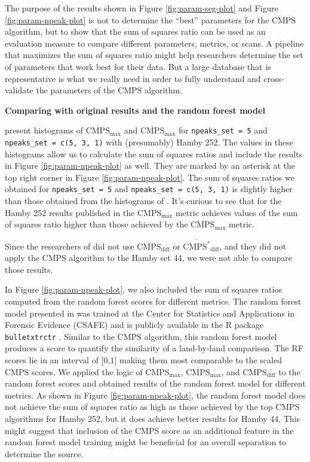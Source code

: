 The purpose of the results shown in Figure \ref{fig:param-seg-plot} and
Figure \ref{fig:param-npeak-plot} is not to determine the ``best''
parameters for the CMPS algorithm, but to show that the sum of squares
ratio can be used as an evaluation measure to compare different
parameters, metrics, or scans. A pipeline that maximizes the sum of
squares ratio might help researchers determine the set of parameters
that work best for their data. But a large database that is
representative is what we really need in order to fully understand and
cross-validate the parameters of the CMPS algorithm.

\textbf{Comparing with original results and the random forest model}

\citet{cmps} present histograms of \(\mathrm{CMPS_{max}}\) and
\(\mathrm{\overline{CMPS}_{max}}\) for \texttt{npeaks\_set\ =\ 5} and
\texttt{npeaks\_set\ =\ c(5,\ 3,\ 1)} with (presumably) Hamby 252. The
values in these histograms allow us to calculate the sum of squares
ratios and include the results in Figure \ref{fig:param-npeak-plot} as
well. They are marked by an asterisk at the top right corner in Figure
\ref{fig:param-npeak-plot}. The sum of squares ratios we obtained for
\texttt{npeaks\_set\ =\ 5} and \texttt{npeaks\_set\ =\ c(5,\ 3,\ 1)} is
slightly higher than those obtained from the histograms of \citet{cmps}.
It's curious to see that for the Hamby 252 results published in
\citet{cmps} the \(\mathrm{{CMPS}_{max}}\) metric achieves values of the
sum of squares ratio higher than those achieved by the
\(\mathrm{\overline{CMPS}_{max}}\) metric.

Since the researchers of \citet{cmps} did not use
\(\mathrm{\overline{CMPS}_{diff}}\) or
\(\mathrm{\overline{CMPS^*}_{diff}}\), and they did not apply the CMPS
algorithm to the Hamby set 44, we were not able to compare those
results.

In Figure \ref{fig:param-npeak-plot}, we also included the sum of
squares ratios computed from the random forest scores \citep{aoas} for
different metrics. The random forest model presented in \citet{aoas} was
trained at the Center for Statistics and Applications in Forensic
Evidence (CSAFE) and is publicly available in the R package
\texttt{bulletxtrctr} \citep{bulletxtrctr}. Similar to the CMPS
algorithm, this random forest model produces a score to quantify the
similarity of a land-by-land comparison. The RF scores lie in an
interval of {[}0,1{]} making them most comparable to the scaled CMPS
scores. We applied the logic of \(\mathrm{{CMPS}_{max}}\),
\(\mathrm{\overline{CMPS}_{max}}\), and
\(\mathrm{\overline{CMPS}_{diff}}\) to the random forest scores and
obtained results of the random forest model for different metrics. As
shown in Figure \ref{fig:param-npeak-plot}, the random forest model does
not achieve the sum of squares ratio as high as those achieved by the
top CMPS algorithms for Hamby 252, but it does achieve better results
for Hamby 44. This might suggest that inclusion of the CMPS score as an
additional feature in the random forest model training might be
beneficial for an overall separation to determine the source.

